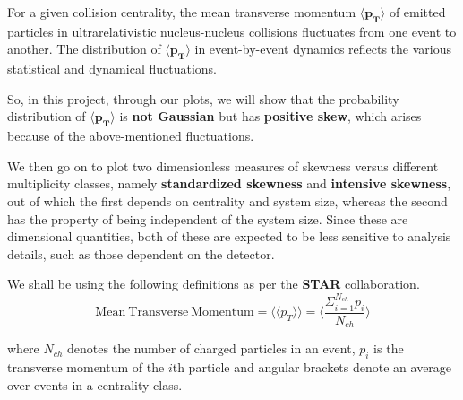 \documentclass[letterpaper,aps,prc,superscriptaddress,nofootinbib,10pt,showpacs,floatfix]{revtex4-2}%
\newcommand{\bfrac}[2]{\frac{\displaystyle #1}{\displaystyle #2}}
\begin{document}
For a given collision centrality, the mean transverse momentum $\mathbf{\langle  p_T\rangle}$ of emitted particles in ultrarelativistic nucleus-nucleus collisions fluctuates from one event to another. The distribution of $\mathbf{\langle  p_T\rangle}$ in event-by-event dynamics reflects the various statistical and dynamical fluctuations.
 
So, in this project, through our plots, we will show that the probability distribution of $\mathbf{\langle  p_T\rangle}$ is \textbf{not Gaussian} but has \textbf{positive skew}, which arises because of the above-mentioned fluctuations.

We then go on to plot two dimensionless measures of skewness versus different multiplicity classes, namely \textbf{standardized skewness} and \textbf{intensive skewness}, out of which the first depends on centrality and system size, whereas the second has the property of being independent of the system size. Since these are dimensional quantities, both of these are expected to be less sensitive to analysis details,
such as those dependent on the detector.

We shall be using the following definitions as per the \textbf{STAR} collaboration.
\vspace{-1mm}
\begin{equation}
\label{eq:1}
\mathrm{Mean\ Transverse\ Momentum}=\langle \langle p_T\rangle \rangle =\langle \bfrac{\Sigma_{i=1}^{N_{ch}} p_i}{N_{ch}}\rangle 
\end{equation}

where $N_{ch}$ denotes the number of charged particles in an event, $p_i$ is the transverse momentum of the $i$th particle and angular brackets denote an average over events in a centrality class.
\end{document}
